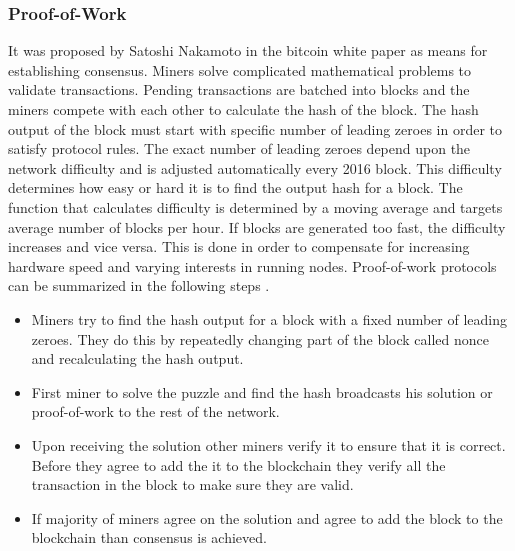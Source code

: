 \subsubsection{Proof-of-Work} \label{PW}
It was proposed by Satoshi Nakamoto in the bitcoin white paper \cite{paper:001}as means for establishing consensus. Miners solve complicated mathematical problems to validate transactions. Pending transactions are batched into blocks and the miners compete with each other to calculate the hash of the block. The hash output of the block must start with specific number of leading zeroes in order to satisfy protocol rules. The exact number of leading zeroes depend upon the network difficulty and is adjusted automatically every 2016 block. This difficulty determines how easy or hard it is to find the output hash for a block. The function that calculates difficulty is determined by a moving average and targets average number of blocks per hour. If blocks are generated too fast, the difficulty increases and vice versa. This is done in order to compensate for increasing hardware speed and varying interests in running nodes. Proof-of-work protocols can be summarized in the following steps \cite{medium:001}.

\begin{itemize}
  \item Miners try to find the hash output for a block with a fixed number of leading zeroes. They do this by repeatedly changing part of the block called nonce and recalculating the hash output.
  \item First miner to solve the puzzle and find the hash broadcasts his solution or proof-of-work to the rest of the network.
  \item Upon receiving the solution other miners verify it to ensure that it is correct. Before they agree to add the it to the blockchain they verify all the transaction in the block to make sure they are valid.
  \item If majority of miners agree on the solution and agree to add the block to the blockchain than consensus is achieved.
\end{itemize}


